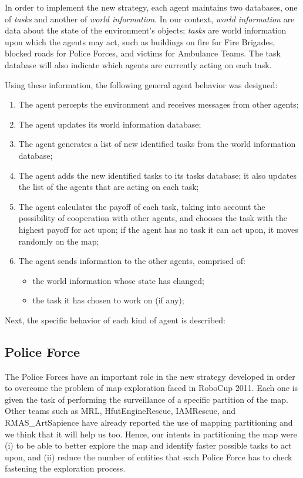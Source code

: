 \documentclass{llncs}
\begin{document}
In order to implement the new strategy, each agent maintains two databases, one of {\it tasks} and another of {\it world information}. In our context, {\it world information} are data about the state of the environment's objects; {\it tasks} are world information upon which the agents may act, such as buildings on fire for Fire Brigades, blocked roads for Police Forces, and victims for Ambulance Teams. The task database will also indicate which agents are currently acting on each task.

Using these information, the following general agent behavior was designed:
\begin{enumerate}
\item The agent percepts the environment and receives messages from other agents;
\item The agent updates its world information database;
\item The agent generates a list of new identified tasks from the world information database;
\item The agent adds the new identified tasks to its tasks database; it also updates the list of the agents that are acting on each task;
\item The agent calculates the payoff of each task, taking into account the possibility of cooperation with other agents, and chooses the task with the highest payoff for act upon; if the agent has no task it can act upon, it moves randomly on the map;
\item The agent sends information to the other agents, comprised of:
\begin{itemize}
\item the world information whose state has changed;
\item the task it has chosen to work on (if any);
\end{itemize}
\end{enumerate}

Next, the specific behavior of each kind of agent is described:
\subsection{Police Force}
\label{subsec:policeForce}
The Police Forces have an important role in the new strategy developed in order to overcome the problem of map exploration faced in RoboCup 2011. Each one is given the task of performing the surveillance of a specific partition of the map. Other teams such as MRL, HfutEngineRescue, IAMRescue, and RMAS\_ArtSapience have already reported the use of mapping partitioning and we think that it will help us too. Hence, our intents in partitioning the map were (i) to be able to better explore the map and identify faster possible tasks to act upon, and (ii) reduce the number of entities that each Police Force has to check fastening the exploration process.
\end{document}
